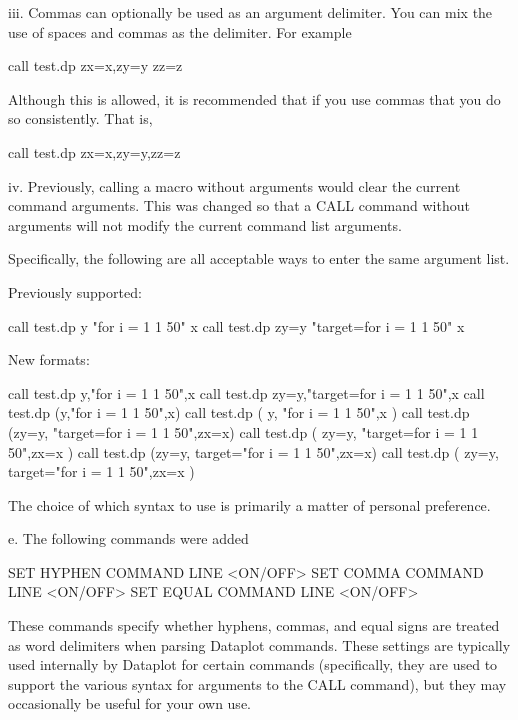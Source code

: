          iii. Commas can optionally be used as an argument delimiter.  You
              can mix the use of spaces and commas as the delimiter.  For
              example

                   call test.dp  zx=x,zy=y  zz=z

              Although this is allowed, it is recommended that if you use
              commas that you do so consistently.  That is,

                   call test.dp  zx=x,zy=y,zz=z

          iv. Previously, calling a macro without arguments would clear
              the current command arguments.  This was changed so that
              a CALL command without arguments will not modify the current
              command list arguments.

       Specifically, the following are all acceptable ways to enter the
       same argument list.

           Previously supported:

              call test.dp  y "for i = 1 1 50" x
              call test.dp  zy=y "target=for i = 1 1 50" x

           New formats:

              call test.dp  y,"for i = 1 1 50",x
              call test.dp  zy=y,"target=for i = 1 1 50",x
              call test.dp  (y,"for i = 1 1 50",x)
              call test.dp  ( y, "for i = 1 1 50",x )
              call test.dp  (zy=y, "target=for i = 1 1 50",zx=x)
              call test.dp  ( zy=y, "target=for i = 1 1 50",zx=x )
              call test.dp  (zy=y, target="for i = 1 1 50",zx=x)
              call test.dp  ( zy=y, target="for i = 1 1 50",zx=x )

       The choice of which syntax to use is primarily a matter of personal
       preference.

    e. The following commands were added

          SET HYPHEN COMMAND LINE <ON/OFF>
          SET COMMA COMMAND LINE  <ON/OFF>
          SET EQUAL COMMAND LINE  <ON/OFF>

       These commands specify whether hyphens, commas, and equal signs
       are treated as word delimiters when parsing Dataplot commands.
       These settings are typically used internally by Dataplot for
       certain commands (specifically, they are used to support the
       various syntax for arguments to the CALL command), but they may
       occasionally be useful for your own use.


